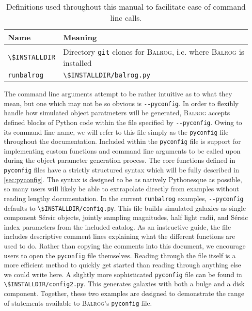 \documentclass[11pt]{book}
\newcommand{\codett}[1]{\lstinline{#1}}
\newcommand{\py}{Python}
\newcommand{\pyconfig}{\codett{pyconfig}}
\newcommand{\balrog}{\textsc{Balrog}}
\newcommand{\opt}[1]{\codett{--#1}}
\newcommand{\sersic}{S\'{e}rsic}
\begin{document}
\begin{table}
\caption{Definitions used throughout this manual to facilitate ease of command line calls.}
\label{tab:def}
\begin{tabular}{l l}
\toprule %
\rowcolor{gray2} \textbf{Name} & \textbf{Meaning} \\ \midrule
\codett{\$INSTALLDIR} & Directory \codett{git} clones for \balrog{}, i.e. where \balrog{} is installed \\
\codett{runbalrog} & \codett{\$INSTALLDIR/balrog.py} \\ \bottomrule %
\end{tabular}
\end{table}

The command line arguments attempt to be rather intuitive as to what they mean,
but one which may not be so obvious is \opt{pyconfig}.
In order to flexibly handle how simulated object paratmeters will be generated, \balrog{} accepts defined blocks of \py{} code
within the file specified by \opt{pyconfig}.
Owing to its command line name, we will refer to this file simply as the \pyconfig{} file
throughout the documentation.
Included within the \pyconfig{} file is support for implementing custom functions 
and command line arguments to be called upon during the object parameter generation process.
The core functions defined in \pyconfig{} files have a strictly
structured syntax which will be fully described in \autoref{sec:pyconfig}. 
The syntax is designed to be as natively \py{}esque as possible, so
many users will likely be able to extrapolate directly from examples without reading lengthy documentation. 
In the current \codett{runbalrog} examples, \opt{pyconfig} defaults to \codett{\$INSTALLDIR/config.py}.
This file builds simulated galaxies as single component \sersic{} objects, 
jointly sampling magnitudes, half light radii, and \sersic{} index parameters from the included catalog.
As an instructive guide, the file includes descriptive comment lines explaining what the different functions are used to do.
Rather than copying the comments into this document, we encourage users to open the \pyconfig{} file themselves.
Reading through the file itself is a more efficient method to quickly get started than
reading through anything else we could write here.
A slightly more sophisticated \pyconfig{} file can be found in \codett{\$INSTALLDIR/config2.py}.
This generates galaxies with both a bulge and a disk component.
Together, these two examples are designed to demonstrate the range of statements available to 
\balrog{}'s \pyconfig{} file.
\end{document}
